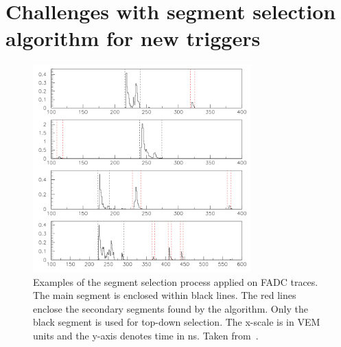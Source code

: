 \chapter{Challenges with segment selection algorithm for new triggers} 
\label{sec:app_3}
\begin{figure}[t!]
\centering
\includegraphics[width=0.75\textwidth]{thesis_figures/App3/Segment_selection.png}
\caption{Examples of the segment selection process applied on FADC traces. The main segment is enclosed within black lines. The red lines enclose the secondary segments found by the algorithm. Only the black segment is used for top-down selection. The x-scale is in VEM units and the y-axis denotes time in ns. Taken from~\cite{gap_segment_selection}.}
\label{fig:segment_selection}
\end{figure}

